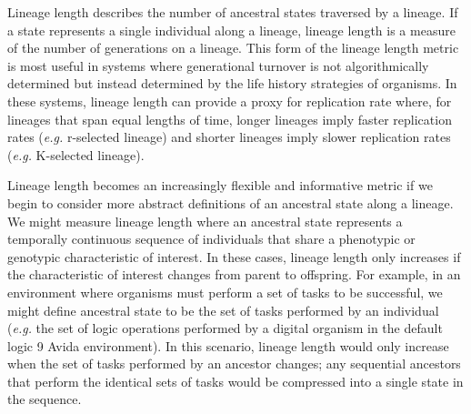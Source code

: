\documentclass[letterpaper]{article}
\begin{document}
Lineage length describes the number of ancestral states traversed by a lineage. If a state represents a single individual along a lineage, lineage length is a measure of the number of generations on a lineage. This form of the lineage length metric is most useful in systems where generational turnover is not algorithmically determined but instead determined by the life history strategies of organisms. In these systems, lineage length can provide a proxy for replication rate where, for lineages that span equal lengths of time, longer lineages imply faster replication rates (\textit{e.g.} r-selected lineage) and shorter lineages imply slower replication rates (\textit{e.g.} K-selected lineage). 

Lineage length becomes an increasingly flexible and informative metric if we begin to consider more abstract definitions of an ancestral state along a lineage. 
We might measure lineage length where an ancestral state represents a temporally continuous sequence of individuals that share a phenotypic or genotypic characteristic of interest. In these cases, lineage length only increases if the characteristic of interest changes from parent to offspring. For example, in an environment where organisms must perform a set of tasks to be successful, we might define ancestral state to be the set of tasks performed by an individual (\textit{e.g.} the set of logic operations performed by a digital organism in the default logic 9 Avida environment). In this scenario, lineage length would only increase when the set of tasks performed by an ancestor changes; any sequential ancestors that perform the identical sets of tasks would be compressed into a single state in the sequence. 
\end{document}
